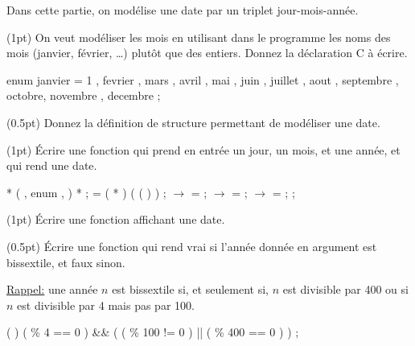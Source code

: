 

Dans cette partie, on mod{\'e}lise une date par un triplet
jour-mois-ann{\'e}e.

\question (1pt) On veut mod{\'e}liser les mois en utilisant dans le programme
les noms des mois (janvier, f{\'e}vrier, \ldots) plut{\^o}t que des entiers.
Donnez la d{\'e}claration C {\`a} {\'e}crire.

\begin{solution}
  \begin{Ccode}
    \ctab{}enum  \lb janvier = 1 , fevrier , mars , avril , 
    \ctab{} mai , juin , juillet , aout , septembre , octobre, 
    \ctab{}novembre , decembre \rb ;
  \end{Ccode}
\end{solution}


\question (0.5pt) Donnez la d{\'e}finition de structure permettant de
mod{\'e}liser une date.

\question (1pt) {\'E}crire une fonction  qui prend en entr{\'e}e
un jour, un mois, et une ann{\'e}e,  et qui rend une date.

\begin{solution}
  \begin{Ccode}
    \ctab{}\cstruct {} *
    \ctab{} ( \cint {} , enum   , \cint {} )
    \ctab{}\lb
    \ctab{}  \cstruct {} *  ;
    \ctab{}   = ( \cstruct {} * )  (  ( \cstruct {} ) ) ;
    \ctab{}  \ensuremath{\rightarrow} =  ;
    \ctab{}  \ensuremath{\rightarrow} =  ;
    \ctab{}  \ensuremath{\rightarrow} =  ;
    \ctab{}  \creturn {} ;
    \ctab{}\rb
  \end{Ccode}
\end{solution}

\question (1pt) {\'E}crire une fonction affichant une date.

\question (0.5pt) {\'E}crire une fonction  qui rend vrai si
l'ann{\'e}e donn{\'e}e en argument est bissextile, et faux sinon.

\hspace*{5em}\parbox{0.8\linewidth}{\underline{Rappel:} une ann{\'e}e
  $n$ est bissextile si, et seulement si, $n$ est divisible par 400 ou
  si $n$ est divisible par 4 mais pas par 100.}

\begin{solution}
  \begin{Ccode}
\ctab{}\cint
\ctab{} ( \cint {} ) 
\ctab{}\lb
\ctab{}  \creturn (  \% 4 == 0 ) \&\& ( (  \% 100 != 0 ) || (  \% 400 == 0 ) ) ;
\ctab{}\rb
  \end{Ccode}
\end{solution}

